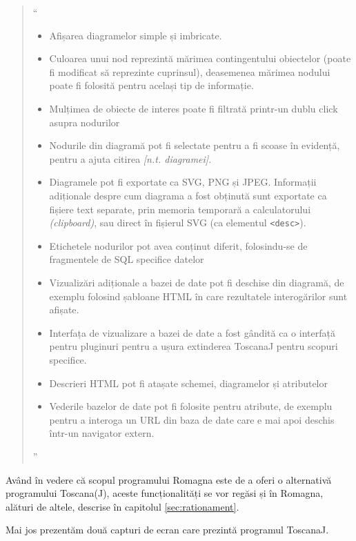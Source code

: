 \documentclass[12pt, a4paper, twoside, romanian]{teza-upb}
\begin{document}
        \begin{quote}
          ``
          \begin{itemize}
            \item Afișarea diagramelor simple și imbricate.
            \item Culoarea unui nod reprezintă mărimea contingentului obiectelor (poate fi modificat să reprezinte cuprinsul), deasemenea mărimea nodului poate fi folosită pentru același tip de informație.
            \item Mulțimea de obiecte de interes poate fi filtrată printr-un dublu click asupra nodurilor
            \item Nodurile din diagramă pot fi selectate pentru a fi scoase în evidență, pentru a ajuta citirea \textit{[n.t. diagramei]}.
            \item Diagramele pot fi exportate ca SVG, PNG și JPEG. Informații adiționale despre cum diagrama a fost obținută sunt exportate ca fișiere text separate, prin memoria temporară a calculatorului \textit{(clipboard)}, sau direct în fișierul SVG (ca elementul \verb=<desc>=).
            \item Etichetele nodurilor pot avea conținut diferit, folosindu-se de fragmentele de SQL specifice datelor
            \item Vizualizări adiționale a bazei de date pot fi deschise din diagramă, de exemplu folosind șabloane HTML în care rezultatele interogărilor sunt afișate.
            \item Interfața de vizualizare a bazei de date a fost gândită ca o interfață pentru pluginuri pentru a ușura extinderea ToscanaJ pentru scopuri specifice.
            \item Descrieri HTML pot fi atașate schemei, diagramelor și atributelor
            \item Vederile bazelor de date pot fi folosite pentru atribute, de exemplu pentru a interoga un URL din baza de date care e mai apoi deschis într-un navigator extern.
          \end{itemize}
          ''
        \end{quote}

        Având în vedere că scopul programului Romagna este de a oferi o alternativă programului Toscana(J), aceste funcționalități se vor regăsi și în Romagna, alături de altele, descrise în capitolul \ref{sec:rationament}.

        Mai jos prezentăm două capturi de ecran care prezintă programul ToscanaJ.
\end{document}

